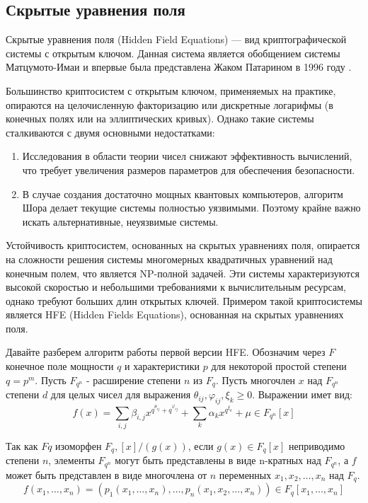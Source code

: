 \subsection{Скрытые уравнения поля}

Скрытые уравнения поля (Hidden Field Equations) — вид криптографической системы с открытым ключом. Данная система является обобщением системы Матцумото-Имаи \cite{matsuo-imai} и впервые была представлена Жаком Патарином в 1996 году \cite{HFE}. 

Большинство криптосистем с открытым ключом, применяемых на практике, опираются на целочисленную факторизацию или дискретные логарифмы (в конечных полях или на эллиптических кривых). Однако такие системы сталкиваются с двумя основными недостатками:

\begin{enumerate}
    \item Исследования в области теории чисел снижают эффективность вычислений, что требует увеличения размеров параметров для обеспечения безопасности. 
    \item В случае создания достаточно мощных квантовых компьютеров, алгоритм Шора \cite{Shor} делает текущие системы полностью уязвимыми. Поэтому крайне важно искать альтернативные, неуязвимые системы.
\end{enumerate}

Устойчивость криптосистем, основанных на скрытых уравнениях поля, опирается на сложности решения системы многомерных квадратичных уравнений над конечным полем, что является NP-полной задачей. Эти системы характеризуются высокой скоростью и небольшими требованиями к вычислительным ресурсам, однако требуют больших длин открытых ключей. Примером такой криптосистемы является HFE (Hidden Fields Equations), основанная на скрытых уравнениях поля.

Давайте разберем алгоритм работы первой версии HFE. Обозначим через $F$ конечное поле мощности $q$ и характеристики $p$ для некоторой простой степени $q = p ^ m$. Пусть $F_{q^n}$ - расширение степени $n$ из $F_q$. Пусть многочлен $x$ над $F_{q^n}$ степени $d$ для целых чисел для выражения $\theta_{ij}, \varphi_{ij}, \xi_k \geqslant 0 $. Выражении имет вид:
\begin{equation}
    f(x) = \sum_{i,j} \beta_{i,j}x^{q^{\theta_{ij}} + q^{\varphi_{ij}}} + \sum_{k} \alpha_k x^{q^{\xi_k}} + \mu \in F_{q^n} [x]
\end{equation}

Так как $Fq$ изоморфен $F_q,[x]/(g(x))$, если $g(x) \in F_q[x]$ неприводимо степени $n$, элементы $F_{q^n}$ могут быть представлены в виде n-кратных над $F_{q^n}$, а $f$ может быть представлен в виде многочлена от $n$ переменных $x_1,x_2,\ldots,x_n$ над $F_q$.
\begin{equation}
    f(x_1,\ldots,x_n) = (p_1(x_1,\ldots,x_n),\ldots,p_n(x_1,x_2,\ldots,x_n)) \in F_q [x_1,\ldots,x_n]
\end{equation}

